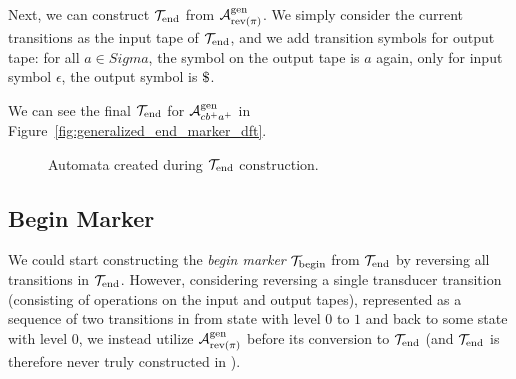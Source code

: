 
Next, we can construct $\mathcal{T}_{\text{end}}$ from $\mathcal{A}^{\text{gen}}_{\text{rev(}\pi\text{)}}$.
We simply consider the current transitions as the input tape of $\mathcal{T}_{\text{end}}$,
and we add transition symbols for output tape: for all $a \in Sigma$, the  symbol on the output tape is $a$ again, only for input symbol $\epsilon$, the output symbol is $\marker$.

We can see the final $\mathcal{T}_{\text{end}}$ for $\mathcal{A}^{\text{gen}}_{cb^+a^+}$ in Figure~\ref{fig:generalized_end_marker_dft}.
\begin{figure}[ht]
    \centering
    \quad
    \quad
    \caption{
      Automata created during $\mathcal{T}_{\text{end}}$ construction.
    }
    \label{fig:end_marker_auts}%
\end{figure}

\subsection{Begin Marker \nft}

We could start constructing the \emph{begin marker} \nft $\mathcal{T}_{\text{begin}}$ from $\mathcal{T}_{\text{end}}$ by reversing all transitions in $\mathcal{T}_{\text{end}}$.
However, considering reversing a single transducer transition (consisting of operations on the input and output tapes), represented as a sequence of two \nfa transitions in \mata from state with level $0$ to $1$ and back to some state with level $0$, we instead utilize $\mathcal{A}^{\text{gen}}_{\text{rev(}\pi\text{)}}$ before its conversion to $\mathcal{T}_{\text{end}}$ (and $\mathcal{T}_{\text{end}}$ is therefore never truly constructed in \mata).

